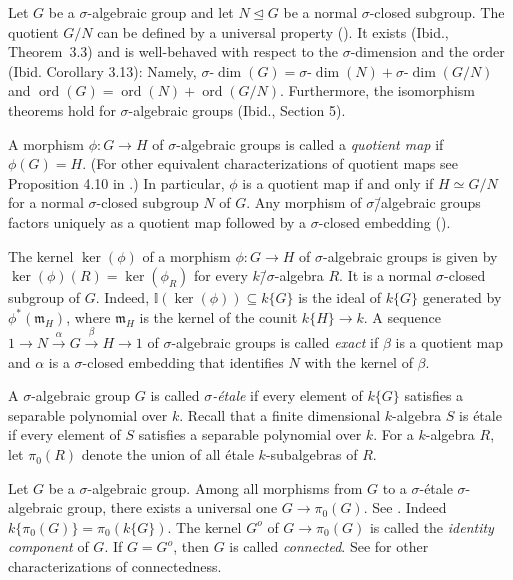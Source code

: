 \documentclass[oneside,reqno]{amsart}
\theoremstyle{definition}
\newcommand{\f}{\phi}
\newcommand{\sdim}{\sigma\text{-}\dim}
\newcommand{\ord}{\operatorname{ord}}
\newcommand{\s}{\sigma}
\newcommand{\I}{\mathbb{I}}
\newcommand{\ks}{$k$\=/$\s$}
\begin{document}
Let $G$ be a $\s$-algebraic group and let $N\unlhd G$ be a normal $\s$-closed subgroup. The quotient $G/N$ can be defined by a universal property (\cite[Def. 3.1]{Wibmer:almostsimple}). It exists (Ibid., Theorem~3.3) and is well-behaved with respect to the $\s$-dimension and the order (Ibid. Corollary 3.13): Namely, $\sdim(G)=\sdim(N)+\sdim(G/N)$ and $\ord(G)=\ord(N)+\ord(G/N)$. Furthermore, the isomorphism theorems hold for $\s$-algebraic groups (Ibid., Section 5).

A morphism $\f\colon G\to H$ of $\s$-algebraic groups is called a \emph{quotient map} if $\f(G)=H$. (For other equivalent characterizations of quotient maps see Proposition 4.10 in \cite{Wibmer:almostsimple}.) In particular, $\f$ is a quotient map if and only if $H\simeq G/N$ for a normal $\s$-closed subgroup $N$ of $G$. Any morphism of $\s$\=/algebraic groups factors uniquely as a quotient map followed by a $\s$-closed embedding (\cite[Theorem~4.14]{Wibmer:almostsimple}).

The kernel $\ker(\f)$ of a morphism $\f\colon G\to H$ of $\s$-algebraic groups is given by $\ker(\f)(R)=\ker(\f_R)$ for every \ks-algebra $R$. It is a normal $\s$-closed subgroup of $G$. Indeed, $\I(\ker(\f))\subseteq k\{G\}$ is the ideal of $k\{G\}$ generated by $\f^*(\mathfrak{m}_H)$, where $\mathfrak{m}_H$ is the kernel of the counit $k\{H\}\to k$.
A sequence $1 \to N \xrightarrow{\alpha} G\xrightarrow{\beta} H\to 1$ of $\s$-algebraic groups is called \emph{exact} if $\beta$ is a quotient map and $\alpha$ is a $\s$-closed embedding that identifies $N$ with the kernel of $\beta$. 

A $\s$-algebraic group $G$ is called \emph{$\s$-\'{e}tale} if every element of $k\{G\}$ satisfies a separable polynomial over $k$. 
Recall that a finite dimensional $k$-algebra $S$ is \'{e}tale if every element of $S$ satisfies a separable polynomial over $k$. For a $k$-algebra $R$, let $\pi_0(R)$ denote the union of all \'{e}tale $k$-subalgebras of $R$. %

Let $G$ be a $\s$-algebraic group. Among all morphisms from $G$ to a $\s$-\'{e}tale $\s$-algebraic group, there exists a universal one $G\to \pi_0(G)$. See \cite[Prop. 6.13]{Wibmer:FinitenessPropertiesOfAffineDifferenceAlgebraicGroups}. Indeed $k\{\pi_0(G)\}=\pi_0(k\{G\})$. The kernel $G^o$ of $G\to\pi_0(G)$ is called the \emph{identity component} of $G$. If $G=G^o$, then $G$ is called \emph{connected}. 
See \cite[Lemma 6.7]{Wibmer:almostsimple} for other characterizations of connectedness. 
\end{document}
